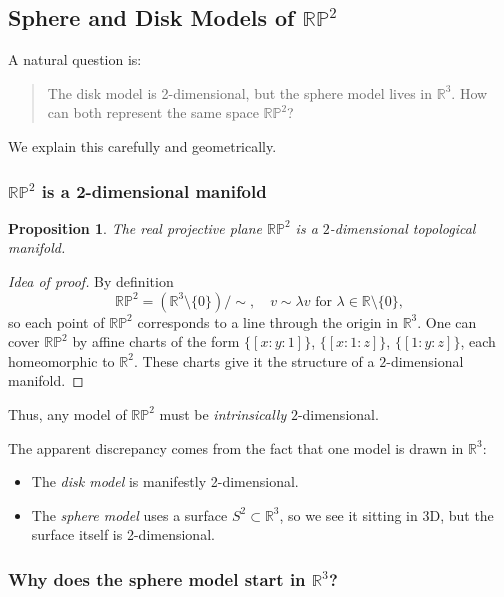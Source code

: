 \documentclass[12pt,a4paper]{article}
\theoremstyle{plain}
\newtheorem{proposition}[theorem]{Proposition}
\theoremstyle{definition}      %
\begin{document}
	
	\subsection{Sphere and Disk Models of $\mathbb{RP}^2$}
	
	A natural question is:
	
	\begin{quote}
		The disk model is 2-dimensional, but the sphere model lives in $\mathbb{R}^3$.
		How can both represent the same space $\mathbb{RP}^2$?
	\end{quote}
	
	We explain this carefully and geometrically.
	
	\subsubsection{$\mathbb{RP}^2$ is a 2-dimensional manifold}
	
	\begin{proposition}
		The real projective plane $\mathbb{RP}^2$ is a $2$-dimensional topological
		manifold.
	\end{proposition}
	
	\begin{proof}[Idea of proof]
		By definition
		\[
		\mathbb{RP}^2 = (\mathbb{R}^3 \setminus \{0\}) / \sim,
		\quad
		v \sim \lambda v \text{ for } \lambda \in \mathbb{R}\setminus\{0\},
		\]
		so each point of $\mathbb{RP}^2$ corresponds to a line through the origin in
		$\mathbb{R}^3$.  One can cover $\mathbb{RP}^2$ by affine charts of the form
		$\{[x:y:1]\}$, $\{[x:1:z]\}$, $\{[1:y:z]\}$, each homeomorphic to $\mathbb{R}^2$.
		These charts give it the structure of a $2$-dimensional manifold.
	\end{proof}
	
	Thus, any model of $\mathbb{RP}^2$ must be \emph{intrinsically} $2$-dimensional.
	
	\medskip
	
	The apparent discrepancy comes from the fact that one model is drawn in
	$\mathbb{R}^3$:
	
	\begin{itemize}
		\item The \emph{disk model} is manifestly 2-dimensional.
		\item The \emph{sphere model} uses a surface $S^2 \subset \mathbb{R}^3$, so we
		see it sitting in 3D, but the surface itself is 2-dimensional.
	\end{itemize}
	
	\subsubsection{Why does the sphere model start in $\mathbb{R}^3$?}
	
\end{document}
